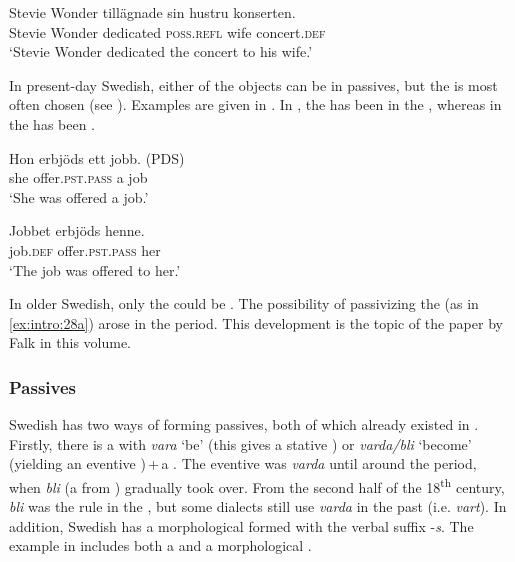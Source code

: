 \documentclass[output=paper]{langscibook}
\begin{document}
\ex
\gll  Stevie Wonder   tillägnade   sin       hustru   konserten.\\
        Stevie Wonder  dedicated  \textsc{poss.refl}  wife     concert\textsc{.def}  \\
\glt        ‘Stevie Wonder dedicated the concert to his wife.’ \citep[137]{Lundquist2014Double}
\z
\z

In present-day Swedish, either of the objects can be  in passives, but the  is most often chosen (see \citealt{Lundquist2004}). Examples are given in . In , the  has been  in the , whereas in  the  has been .


\ea\label{ex:intro:28}
\ea\label{ex:intro:28a}
\gll  Hon   erbjöds         ett jobb. (PDS)\\
she   offer\textsc{.pst.pass}   a    job\\
\glt ‘She was offered a job.’

\ex\label{ex:intro:28b}
\gll  Jobbet   erbjöds         henne. \\
  job.\textsc{def}     offer.\textsc{pst.pass} her\\
    \glt `The job was offered to her.’
\z
\z



In older Swedish, only the  could be . The possibility of passivizing the  (as in \ref{ex:intro:28a}) arose in the  period. This development is the topic of the paper by Falk in this volume.


\subsubsection{Passives}\label{sec:intro:3.3.2}


Swedish has two ways of forming passives, both of which already existed in . Firstly, there is a  with \textit{vara} ‘be’ (this gives a stative ) or \textit{varda/bli} ‘become’ (yielding an eventive )\,+\,a  . The eventive   was \textit{varda} until around the  period, when \textit{bli} (a  from ) gradually took over. From the second half of the 18\textsuperscript{th} century, \textit{bli} was the rule in the , but some dialects still use \textit{varda} in the past  (i.e. \textit{vart}). In addition, Swedish has a morphological  formed with the verbal suffix -\textit{s}. The example in  includes both a  and a morphological .
\end{document}
